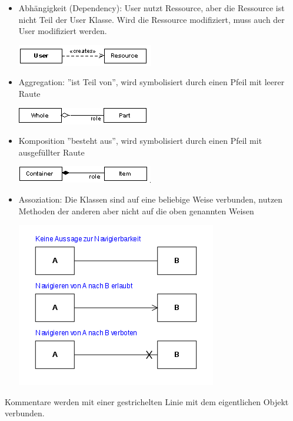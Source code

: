 \documentclass[12pt,a4]{article}
\begin{document}
	 \begin{itemize}
	 	\item Abhängigkeit (Dependency): User nutzt Ressource, aber die Ressource ist nicht Teil der User Klasse. Wird die Ressource modifiziert, muss auch der User modifiziert werden. 
	 		\begin{center}
	 		\includegraphics[width=0.5\linewidth]{images/dependency}
	 		\end{center}
 		
 		\item Aggregation: ''ist Teil von'', wird symbolisiert durch einen Pfeil mit leerer Raute
	 	\begin{center}
	 		\includegraphics[width=0.5\linewidth]{images/aggregation}
	 	\end{center}
	 	
	 	\item Komposition ''besteht aus'', wird symbolisiert durch einen Pfeil mit ausgefüllter Raute
	 	\begin{center}
	 		\includegraphics[width=0.5\linewidth]{images/composition}
	 	\end{center}
 	
 		\item Assoziation: Die Klassen sind auf eine beliebige Weise verbunden, nutzen Methoden der anderen aber nicht auf die oben genannten Weisen
 		\begin{center}
 			\includegraphics[width=0.4\linewidth]{images/association}
 		\end{center}
	 \end{itemize}
	
	Kommentare werden mit einer gestrichelten Linie mit dem eigentlichen Objekt verbunden.
	
\end{document}

